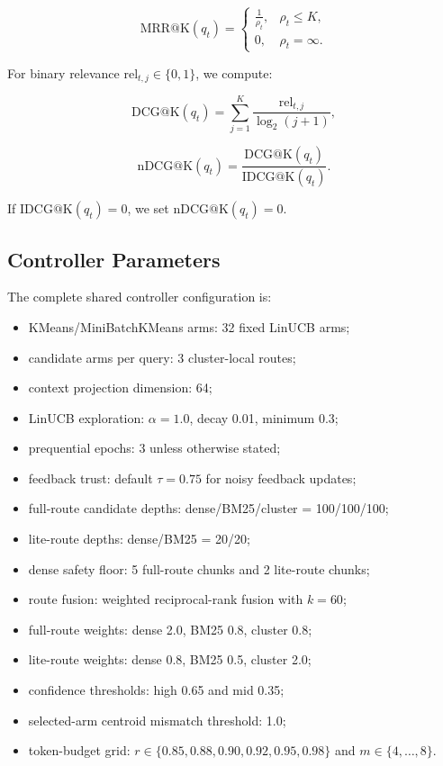 \[
\mathrm{MRR@K}(q_t) =
\begin{cases}
\frac{1}{\rho_t}, & \rho_t \le K, \\
0, & \rho_t = \infty.
\end{cases}
\]

For binary relevance $\mathrm{rel}_{t,j} \in \{0,1\}$, we compute:

\[
\mathrm{DCG@K}(q_t) =
\sum_{j=1}^{K} \frac{\mathrm{rel}_{t,j}}{\log_2(j+1)},
\]

\[
\mathrm{nDCG@K}(q_t) =
\frac{\mathrm{DCG@K}(q_t)}{\mathrm{IDCG@K}(q_t)}.
\]

If $\mathrm{IDCG@K}(q_t)=0$, we set $\mathrm{nDCG@K}(q_t)=0$.

\subsection{Controller Parameters}
\label{sec:12-appendix:controller-parameters}

The complete shared controller configuration is:

\begin{itemize}
\item KMeans/MiniBatchKMeans arms: 32 fixed LinUCB arms;
\item candidate arms per query: 3 cluster-local routes;
\item context projection dimension: 64;
\item LinUCB exploration: $\alpha=1.0$, decay 0.01, minimum 0.3;
\item prequential epochs: 3 unless otherwise stated;
\item feedback trust: default $\tau=0.75$ for noisy feedback updates;
\item full-route candidate depths: dense/BM25/cluster = 100/100/100;
\item lite-route depths: dense/BM25 = 20/20;
\item dense safety floor: 5 full-route chunks and 2 lite-route chunks;
\item route fusion: weighted reciprocal-rank fusion with $k=60$;
\item full-route weights: dense 2.0, BM25 0.8, cluster 0.8;
\item lite-route weights: dense 0.8, BM25 0.5, cluster 2.0;
\item confidence thresholds: high 0.65 and mid 0.35;
\item selected-arm centroid mismatch threshold: 1.0;
\item token-budget grid: $r \in \{0.85,0.88,0.90,0.92,0.95,0.98\}$ and $m \in \{4,\ldots,8\}$.
\end{itemize}

